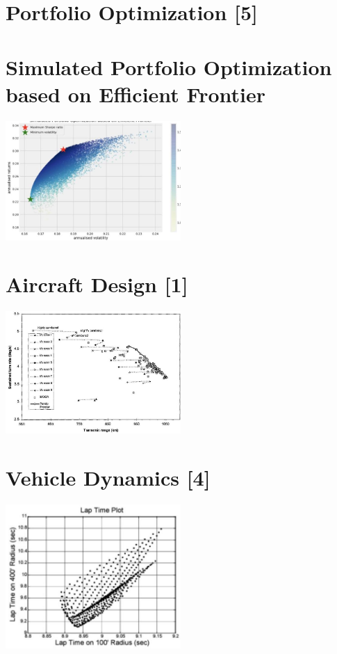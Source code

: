 \section{Portfolio Optimization [5]}
\section{Simulated Portfolio Optimization based on Efficient Frontier}
\includegraphics[width=0.5\textwidth]{optimization/multi-objective/images/2022_02_28_634e8079070800ac7e3cg-20}

\section{Aircraft Design [1]}
\includegraphics[width=0.5\textwidth]{optimization/multi-objective/images/2022_02_28_634e8079070800ac7e3cg-21}

\section{Vehicle Dynamics [4]}
\includegraphics[width=0.5\textwidth]{optimization/multi-objective/images/2022_02_28_634e8079070800ac7e3cg-22}

